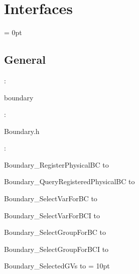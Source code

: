 
\section{Interfaces} 


\parskip = 0pt

\vspace{3mm} \subsection*{General}

: 

boundary
\vspace{2mm}

\vspace{5mm}

: 



Boundary.h
\vspace{2mm}

: 



Boundary\_RegisterPhysicalBC to 

Boundary\_QueryRegisteredPhysicalBC to 

Boundary\_SelectVarForBC to 

Boundary\_SelectVarForBCI to 

Boundary\_SelectGroupForBC to 

Boundary\_SelectGroupForBCI to 

Boundary\_SelectedGVs to 
\vspace{2mm}\parskip = 10pt 
